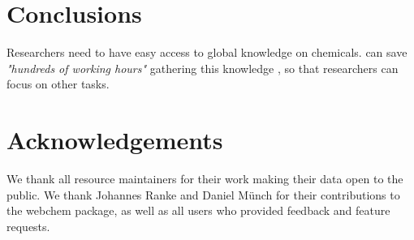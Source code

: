 \documentclass[article, shortnames]{jss}\usepackage[]{graphicx}\usepackage[]{color}
\providecommand{\DIFaddbegin}{} %
\providecommand{\DIFaddend}{} %
\providecommand{\DIFdelbegin}{} %
\providecommand{\DIFdelend}{} %
\begin{document}
\section[Conclusions]{Conclusions}
Researchers need to have easy access to global knowledge on chemicals.
 can save \emph{"hundreds of working hours"} gathering this knowledge \citep{Munch_Galizia_2016}, so that researchers can focus on other tasks.


\section*{Acknowledgements}
We thank all resource maintainers for their work making their data open to the public.
We thank Johannes Ranke and Daniel Münch for their contributions to the webchem package, as well as all users who provided feedback and feature requests.


\DIFdelbegin %
\DIFdelend \DIFaddbegin 
\DIFaddend 
\end{document}
